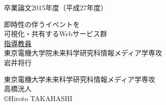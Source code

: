 \pagestyle{empty}
\begin{center}

\LARGE{卒業論文\hspace{10mm}2015年度（平成27年度）}\\

\vspace{19mm}

\huge{即時性の伴うイベントを\\可視化・共有するWebサービス群}\\
\vspace{60mm}
\large{\underline{指導教員}}\\
\large{東京電機大学院未来科学研究科情報メディア学専攻}\\
\Large{岩井将行}\\

\vspace{40mm}

\large{東京電機大学未来科学研究科情報メディア学専攻}\\
\LARGE{高橋洸人}\\
\large{\copyright Hiroto TAKAHASHI}\\
\end{center}
